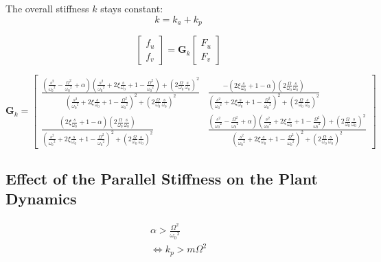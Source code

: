 \documentclass{ISMA_USD2020}
\begin{document}
The overall stiffness \(k\) stays constant:
\begin{equation}
  k = k_a + k_p
\end{equation}

\begin{equation}
\label{eq:Gk_mimo_tf}
\begin{bmatrix} f_u \\ f_v \end{bmatrix} =
\bm{G}_k
\begin{bmatrix} F_u \\ F_v \end{bmatrix}
\end{equation}

\begin{equation}
\label{eq:Gk}
\bm{G}_k =
\begin{bmatrix}
  \frac{\left( \frac{s^2}{{\omega_0}^2} - \frac{\Omega^2}{{\omega_0}^2} + \alpha \right) \left( \frac{s^2}{{\omega_0}^2} + 2 \xi \frac{s}{\omega_0} + 1 - \frac{{\Omega}^2}{{\omega_0}^2} \right) + \left( 2 \frac{\Omega}{\omega_0} \frac{s}{\omega_0} \right)^2}{\left( \frac{s^2}{{\omega_0}^2} + 2 \xi \frac{s}{\omega_0} + 1 - \frac{{\Omega}^2}{{\omega_0}^2} \right)^2 + \left( 2 \frac{\Omega}{\omega_0} \frac{s}{\omega_0} \right)^2} & \frac{- \left( 2 \xi \frac{s}{\omega_0} + 1 - \alpha \right) \left( 2 \frac{\Omega}{\omega_0} \frac{s}{\omega_0} \right)}{\left( \frac{s^2}{{\omega_0}^2} + 2 \xi \frac{s}{\omega_0} + 1 - \frac{{\Omega}^2}{{\omega_0}^2} \right)^2 + \left( 2 \frac{\Omega}{\omega_0} \frac{s}{\omega_0} \right)^2} \\
  \frac{\left( 2 \xi \frac{s}{\omega_0} + 1 - \alpha \right) \left( 2 \frac{\Omega}{\omega_0} \frac{s}{\omega_0} \right)}{\left( \frac{s^2}{{\omega_0}^2} + 2 \xi \frac{s}{\omega_0} + 1 - \frac{{\Omega}^2}{{\omega_0}^2} \right)^2 + \left( 2 \frac{\Omega}{\omega_0} \frac{s}{\omega_0} \right)^2} & \frac{\left( \frac{s^2}{{\omega_0}^2} - \frac{\Omega^2}{{\omega_0}^2} + \alpha \right) \left( \frac{s^2}{{\omega_0}^2} + 2 \xi \frac{s}{\omega_0} + 1 - \frac{{\Omega}^2}{{\omega_0}^2} \right) + \left( 2 \frac{\Omega}{\omega_0} \frac{s}{\omega_0} \right)^2}{\left( \frac{s^2}{{\omega_0}^2} + 2 \xi \frac{s}{\omega_0} + 1 - \frac{{\Omega}^2}{{\omega_0}^2} \right)^2 + \left( 2 \frac{\Omega}{\omega_0} \frac{s}{\omega_0} \right)^2}
\end{bmatrix}
\end{equation}

\subsection{Effect of the Parallel Stiffness on the Plant Dynamics}
\label{sec:orgdbd366f}
\begin{equation}
  \begin{aligned}
    \alpha > \frac{\Omega^2}{{\omega_0}^2} \\
    \Leftrightarrow k_p > m \Omega^2
  \end{aligned}
\end{equation}
\end{document}

